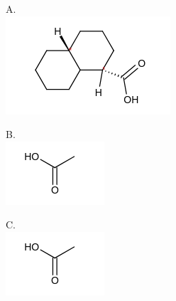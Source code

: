 \documentclass[10pt]{article}
\begin{document}
A.\\
\includegraphics{smile-dbddce577a3a9209a6e82441554e0d606d13ce0d}

B.\\
\includegraphics{smile-cff4f83455b57b615286ec7f92504766c01a0d70}

C.\\
\includegraphics{smile-9bd4e7b92314042ae9e413bf212464ce052593a7}
\end{document}
